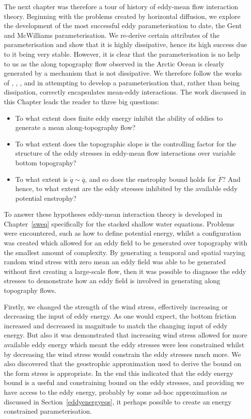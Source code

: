\documentclass[12pt,a4paper]{report}
\newcommand*\thkmean[1]{\overline{#1}}
\newcommand*\spec[1]{\mathring{#1}}
\newcommand*\secref[1]{Section~\ref{#1}}
\begin{document}
The next chapter was therefore a tour of history of eddy-mean flow interaction theory.
Beginning with the problems created by horizontal diffusion, we explore the development
of the most successful eddy parameterisation to date, the Gent and McWilliams parameterisation. We re-derive certain attributes of the parameterisation and show
that it is highly dissipative, hence its high success due to it being very stable. 
However, it is clear that the parameterisation is no help to us as the along topography
flow observed in the Arctic Ocean is clearly generated by a mechanism that is not 
dissipative. We therefore follow the works of \cite{greatbatch1998exploring}, \cite{adcock2000interactions}, \cite{young2012exact}, \cite{marshall2012framework} and
\cite{maddison2013eliassen} in attempting to develop a parameterisation that,
rather than being dissipation, correctly encapsulates mean-eddy interactions.
The work discussed in this Chapter leads the reader to three big questions:
\begin{itemize} 
	\item To what extent does finite eddy energy inhibit the ability of eddies to
	generate a mean along-topography flow?
	\item To what extent does the topographic slope is the controlling factor for the structure of the eddy stresses in eddy-mean flow interactions over variable bottom topography?
	\item To what extent is $\spec{q} \sim \thkmean{q}$, and so does the enstrophy bound holds for $\spec{F}$? And hence, to what extent are  the eddy stresses inhibited by the available eddy potential enstrophy?
\end{itemize} 

To answer these hypotheses eddy-mean interaction theory is developed in Chapter~\ref{sweq}
specifically for the stacked shallow water equations. Problems were encountered, such
as how to define potential energy, whilst a configuration was created which allowed
for an eddy field to be generated over topography with the smallest amount of complexity.
By generating a temporal and spatial varying random wind stress with zero mean
an eddy field was able to be generated without first creating a large-scale flow, then
it was possible to diagnose the eddy stresses to demonstrate how an eddy field is
involved in generating along topography flows. 

Firstly, we changed the strength of the
wind stress, effectively increasing or decreasing the input of eddy energy. As one would
expect, the bottom friction increased and decreased in magnitude to match the changing
input of eddy energy. But also it was demonstrated that increasing wind stress
allowed for more available eddy energy which meant the eddy stresses were less constrained
whilst by decreasing the wind stress would constrain the eddy stresses much more.
We also discovered that the geostrophic approximation used to derive the
bound on the form stress is appropriate. In the end this indicated that the eddy energy
bound is a useful and constraining bound on the eddy stresses, and providing we have
access to the eddy energy, probably by some ad-hoc approximation as discussed in
\secref{eddyenergyeqs}, it perhaps possible to create an energy constrained parameterisation.
\end{document}
